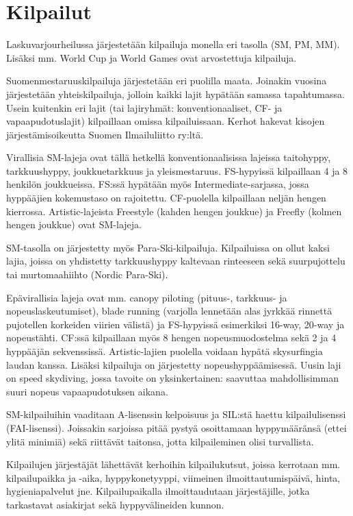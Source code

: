 \section{ Kilpailut }
\label{erikoishypyt-kilpailut}


Laskuvarjourheilussa järjestetään kilpailuja monella eri tasolla (SM, PM, MM). Lisäksi mm. World Cup ja World Games ovat arvostettuja kilpailuja. 


Suomenmestaruuskilpailuja järjestetään eri puolilla maata. Joinakin vuosina järjestetään yhteiskilpailuja, jolloin kaikki lajit hypätään samassa tapahtumassa. Usein kuitenkin eri lajit (tai lajiryhmät: konventionaaliset, CF- ja vapaapudotuslajit) kilpaillaan omissa kilpailuissaan. Kerhot hakevat kisojen järjestämisoikeutta Suomen Ilmailuliitto ry:ltä. 


Virallisia SM-lajeja ovat tällä hetkellä konventionaalisissa lajeissa taitohyppy, tarkkuushyppy, joukkuetarkkuus ja yleismestaruus. FS-hypyissä kilpaillaan 4 ja 8 henkilön joukkueissa. FS:ssä hypätään myös Intermediate-sarjassa, jossa hyppääjien kokemustaso on rajoitettu. CF-puolella kilpaillaan neljän hengen kierrossa. Artistic-lajeista Freestyle (kahden hengen joukkue) ja Freefly (kolmen hengen joukkue) ovat SM-lajeja.  


SM-tasolla on järjestetty myös Para-Ski-kilpailuja. Kilpailuissa on ollut kaksi lajia, joissa on yhdistetty tarkkuushyppy kaltevaan rinteeseen sekä suurpujottelu tai murtomaahiihto (Nordic Para-Ski). 


Epävirallisia lajeja ovat mm. canopy piloting (pituus\mbox{-,} tarkkuus- ja nopeuslaskeutumiset), blade running (varjolla lennetään alas jyrkkää rinnettä pujotellen korkeiden viirien välistä) ja FS-hypyissä esimerkiksi 16-way, 20-way ja nopeustähti. CF:ssä kilpaillaan myös 8 hengen nopeusmuodostelma sekä 2 ja 4 hyppääjän sekvenssissä. Artistic-lajien puolella voidaan hypätä skysurfingia laudan kanssa. Lisäksi kilpailuja on järjestetty nopeushyppäämisessä. Uusin laji on speed skydiving, jossa tavoite on yksinkertainen: saavuttaa mahdollisimman suuri nopeus vapaapudotuksen aikana. 


SM-kilpailuihin vaaditaan A-lisenssin kelpoisuus ja SIL:stä haettu kilpailulisenssi (FAI-lisenssi). Joissakin sarjoissa pitää pystyä osoittamaan hyppymääränsä (ettei ylitä minimiä) sekä riittävät taitonsa, jotta kilpaileminen olisi turvallista. 


Kilpailujen järjestäjät lähettävät kerhoihin kilpailukutsut, joissa kerrotaan mm. kilpailupaikka ja -aika, hyppykonetyyppi, viimeinen ilmoittautumispäivä, hinta, hygieniapalvelut jne. Kilpailupaikalla ilmoittaudutaan järjestäjille, jotka tarkastavat asiakirjat sekä hyppyvälineiden kunnon. 


